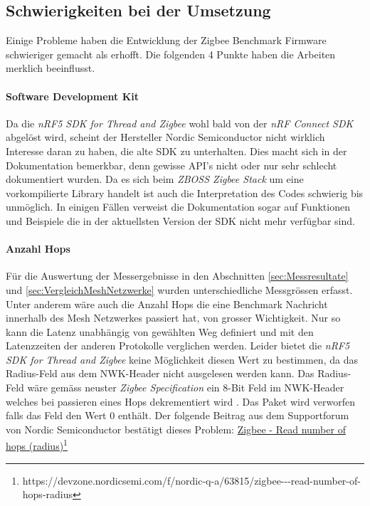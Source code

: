 \subsection{Schwierigkeiten bei der Umsetzung}\label{subsec:ZigbeeSchwierigkeitenbeiderUmsetzung}
Einige Probleme haben die Entwicklung der Zigbee Benchmark Firmware schwieriger gemacht als erhofft.
Die folgenden 4 Punkte haben die Arbeiten merklich beeinflusst. 

\paragraph{Software Development Kit}
Da die \textit{nRF5 SDK for Thread and Zigbee} wohl bald von der \textit{nRF Connect SDK} abgelöst wird, scheint der Hersteller Nordic Semiconductor nicht wirklich Interesse daran zu haben, die alte SDK zu unterhalten.
Dies macht sich in der Dokumentation bemerkbar, denn gewisse API's nicht oder nur sehr schlecht dokumentiert wurden.
Da es sich beim \textit{ZBOSS Zigbee Stack} um eine vorkompilierte Library handelt ist auch die Interpretation des Codes schwierig bis unmöglich.
In einigen Fällen verweist die Dokumentation sogar auf Funktionen und Beispiele die in der aktuellsten Version der SDK nicht mehr verfügbar sind.
 

\paragraph{Anzahl Hops}
Für die Auswertung der Messergebnisse in den Abschnitten \ref{sec:Messresultate} und \ref{sec:VergleichMeshNetzwerke} wurden unterschiedliche Messgrössen erfasst.
Unter anderem wäre auch die Anzahl Hops die eine Benchmark Nachricht innerhalb des Mesh Netzwerkes passiert hat, von grosser Wichtigkeit.
Nur so kann die Latenz unabhängig von gewählten Weg definiert und mit den Latenzzeiten der anderen Protokolle verglichen werden.
Leider bietet die \textit{nRF5 SDK for Thread and Zigbee} keine Möglichkeit diesen Wert zu bestimmen, da das Radius-Feld aus dem NWK-Header nicht ausgelesen werden kann.
Das Radius-Feld wäre gemäss neuster \textit{Zigbee Specification} ein 8-Bit Feld im NWK-Header welches bei passieren eines Hops dekrementiert wird \cite{the_zigbee_alliance_zigbee_2015}.
Das Paket wird verworfen falls das Feld den Wert 0 enthält.
Der folgende Beitrag aus dem Supportforum von Nordic Semiconductor bestätigt dieses Problem: \href{https://devzone.nordicsemi.com/f/nordic-q-a/63815/zigbee---read-number-of-hops-radius}{Zigbee - Read number of hops (radius)\footnote{\url{https://devzone.nordicsemi.com/f/nordic-q-a/63815/zigbee---read-number-of-hops-radius}\cite{cyrill_horath_zigbee_2020}}}



